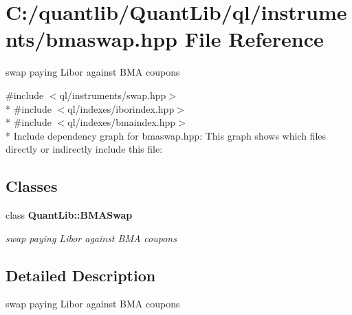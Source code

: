 \section{C\+:/quantlib/\+Quant\+Lib/ql/instruments/bmaswap.hpp File Reference}
\label{bmaswap_8hpp}


swap paying Libor against B\+MA coupons  


{\ttfamily \#include $<$ql/instruments/swap.\+hpp$>$}\\*
{\ttfamily \#include $<$ql/indexes/iborindex.\+hpp$>$}\\*
{\ttfamily \#include $<$ql/indexes/bmaindex.\+hpp$>$}\\*
Include dependency graph for bmaswap.\+hpp\+:
This graph shows which files directly or indirectly include this file\+:
\subsection*{Classes}
\begin{DoxyCompactItemize}
\item 
class {\bf Quant\+Lib\+::\+B\+M\+A\+Swap}
\begin{DoxyCompactList}\small\item\em swap paying Libor against B\+MA coupons \end{DoxyCompactList}\end{DoxyCompactItemize}


\subsection{Detailed Description}
swap paying Libor against B\+MA coupons 

